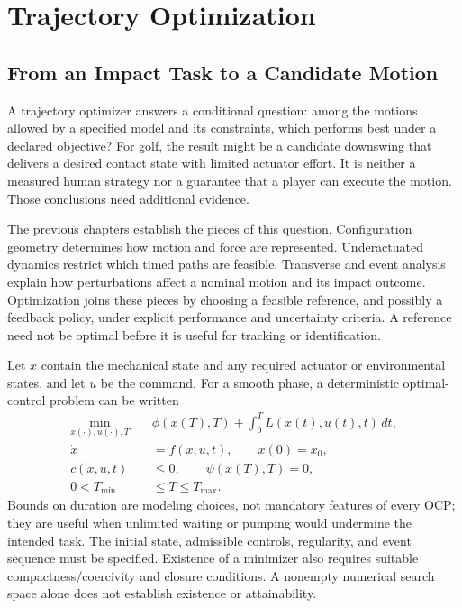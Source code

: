 \chapter{Trajectory Optimization}
\label{ch:trajectory_optimization}

\section{From an Impact Task to a Candidate Motion}

A trajectory optimizer answers a conditional question: among the motions
allowed by a specified model and its constraints, which performs best under
a declared objective? For golf, the result might be a candidate downswing
that delivers a desired contact state with limited actuator effort. It is
neither a measured human strategy nor a guarantee that a player can execute
the motion. Those conclusions need additional evidence.

The previous chapters establish the pieces of this question. Configuration
geometry determines how motion and force are represented. Underactuated
dynamics restrict which timed paths are feasible. Transverse and event
analysis explain how perturbations affect a nominal motion and its impact
outcome. Optimization joins these pieces by choosing a feasible reference,
and possibly a feedback policy, under explicit performance and uncertainty
criteria. A reference need not be optimal before it is useful for tracking
or identification.

Let $x$ contain the mechanical state and any required actuator or environmental
states, and let $u$ be the command. For a smooth phase, a deterministic
optimal-control problem can be written
\begin{equation}\label{eq:ocp_cost}
\begin{aligned}
 \min_{x(\cdot),u(\cdot),T}\quad &
 \phi(x(T),T)+\int_0^T L(x(t),u(t),t)\,dt,\\
 \dot x&=f(x,u,t),\qquad x(0)=x_0,\\
 c(x,u,t)&\leq0,\qquad \psi(x(T),T)=0,\\
 0<T_{\min}&\leq T\leq T_{\max}.
\end{aligned}
\end{equation}
Bounds on duration are modeling choices, not mandatory features of every
OCP; they are useful when unlimited waiting or pumping would undermine the
intended task. The initial state, admissible controls, regularity, and event
sequence must be specified. Existence of a minimizer also requires suitable
compactness/coercivity and closure conditions. A nonempty numerical search
space alone does not establish existence or attainability.


